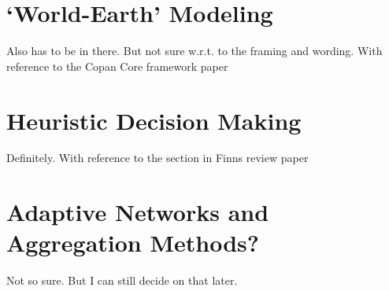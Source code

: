\section{`World-Earth' Modeling}
Also has to be in there. But not sure w.r.t. to the framing and wording.
With reference to the Copan Core framework paper
\section{Heuristic Decision Making}
Definitely. With reference to the section in Finns review paper
\section{Adaptive Networks and Aggregation Methods?}
Not so sure. But I can still decide on that later.
